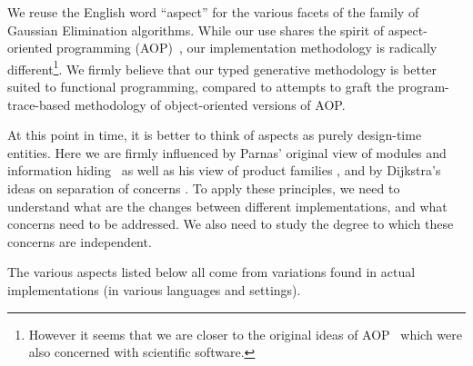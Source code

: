 \documentclass{elsart}
\begin{document}
We reuse the English word ``aspect'' for the various facets of the family
of Gaussian Elimination algorithms.  While our use shares the 
spirit of aspect-oriented programming (AOP)~\cite{kiczales97aspectoriented},
our implementation methodology is radically different\footnote{However it seems
that we are closer to the original ideas of AOP~\cite{709568,mendhekar97rg}
which were also concerned with scientific software.}.  We firmly believe that
our typed generative methodology is better suited to functional
programming, compared to attempts to graft the program-trace-based
methodology of object-oriented versions of AOP.  

At this point in time, it is better to think of aspects as purely
design-time entities.  Here we are firmly influenced by Parnas' original
view of modules and information hiding~\cite{journals/cacm/parnas72a} as well
as his view of product families \cite{journals/tse/Parnas76}, and by
Dijkstra's ideas on separation of concerns \cite{EWD:EWD447}.
To apply these principles, we need
to understand what are the changes between different implementations, and 
what concerns need to be addressed.  We also need to study the degree
to which these concerns are independent.

The various aspects listed below all come from variations found in actual
implementations (in various languages and settings).
\end{document}
